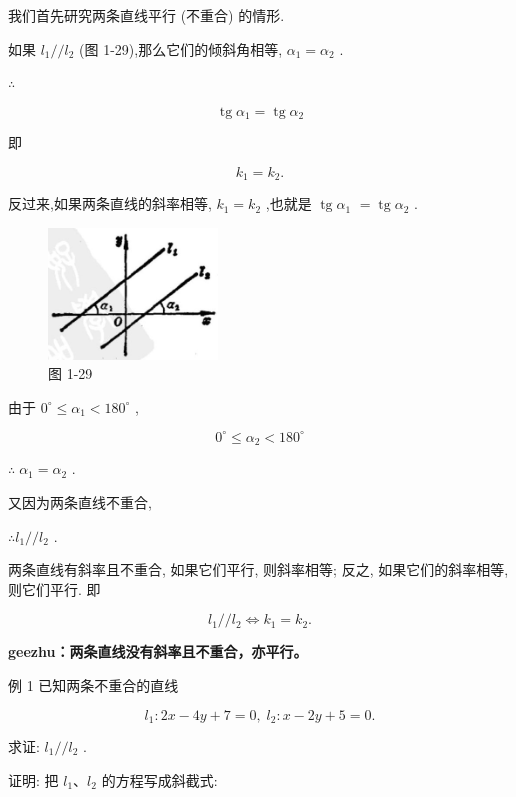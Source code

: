 \documentclass[lang=cn,newtx,10pt,scheme=chinese]{elegantbook}
\begin{document}
我们首先研究两条直线平行 (不重合) 的情形.

如果 \({l}_{1}//{l}_{2}\) (图 1-29),那么它们的倾斜角相等, \({\alpha }_{1} = {\alpha }_{2}\) .

\(\therefore\)

\[
  \operatorname{tg}{\alpha }_{1} = \operatorname{tg}{\alpha }_{2}
\]

即

\[
    {k}_{1} = {k}_{2}\text{.}
\]

反过来,如果两条直线的斜率相等, \({k}_{1} = {k}_{2}\) ,也就是 \(\operatorname{tg}{\alpha }_{1}\) \(= \operatorname{tg}{\alpha }_{2}\) .

\begin{figure}[h]
  \centering
  \includegraphics[max width=0.4\textwidth]{images/01912cc2-ffb6-728e-9ae7-b113ff05c64b_42_859750.jpg}
  \caption{图 1-29}
\end{figure}



由于 \({0}^{ \circ } \leq {\alpha }_{1} < {180}^{ \circ }\) ,

\[
    {0}^{ \circ } \leq {\alpha }_{2} < {180}^{ \circ }
\]

\(\therefore \;{\alpha }_{1} = {\alpha }_{2}\) .

又因为两条直线不重合,

\(\therefore {l}_{1}//{l}_{2}\) .
\begin{corollary}
两条直线有斜率且不重合, 如果它们平行, 则斜率相等; 反之, 如果它们的斜率相等, 则它们平行. 即

\[
    {l}_{1}//{l}_{2} \Leftrightarrow {k}_{1} = {k}_{2}\text{.}
\]

\end{corollary}

\textbf{geezhu：两条直线没有斜率且不重合，亦平行。}

例 1 已知两条不重合的直线

\[
    {l}_{1} : {2x} - {4y} + 7 = 0,\;{l}_{2} : x - {2y} + 5 = 0.
\]

求证: \({l}_{1}//{l}_{2}\) .

证明: 把 \({l}_{1}\text{、}{l}_{2}\) 的方程写成斜截式:
\end{document}
